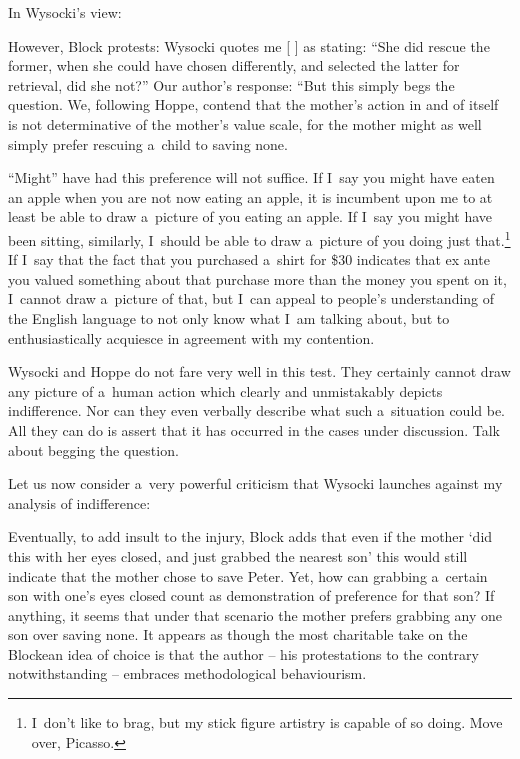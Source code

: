 In Wysocki's view:



However, Block 
\parencite*[][pp.50–51]{block_response_2022} %
 protests: Wysocki quotes me [
\parencite[][pp.50–51]{block_response_2022}%
] as stating: ``She did rescue the former, when she could have chosen differently, and selected the latter for retrieval, did she not?'' Our author's response: ``But this simply begs the question. We, following Hoppe, contend that the mother's action in and of itself is not determinative of the mother's value scale, for the mother might as well simply prefer rescuing a~child to saving none.



``Might'' have had this preference will not suffice. If I~say you might have eaten an apple when you are not now eating an apple, it is incumbent upon me to at least be able to draw a~picture of you eating an apple. If I~say you might have been sitting, similarly, I~should be able to draw a~picture of you doing just that.\footnote{I~don't like to brag, but my stick figure artistry is capable of so doing. Move over, Picasso.} If I~say that the fact that you purchased a~shirt for \$30 indicates that ex ante you valued something about that purchase more than the money you spent on it, I~cannot draw a~picture of that, but I~can appeal to people's understanding of the English language to not only know what I~am talking about, but to enthusiastically acquiesce in agreement with my contention.



Wysocki and Hoppe do not fare very well in this test. They certainly cannot draw any picture of a~human action which clearly and unmistakably depicts indifference. Nor can they even verbally describe what such a~situation could be. All they can do is assert that it has occurred in the cases under discussion. Talk about begging the question.



Let us now consider a~very powerful criticism that Wysocki launches against my analysis of indifference:



Eventually, to add insult to the injury, Block 
\parencite*[][p.51]{block_response_2022} %
 adds that even if the mother ‘did this with her eyes closed, and just grabbed the nearest son' this would still indicate that the mother chose to save Peter. Yet, how can grabbing a~certain son with one's eyes closed count as demonstration of preference for that son? If anything, it seems that under that scenario the mother prefers grabbing any one son over saving none. It appears as though the most charitable take on the Blockean idea of choice is that the author -- his protestations to the contrary notwithstanding -- embraces methodological behaviourism.



